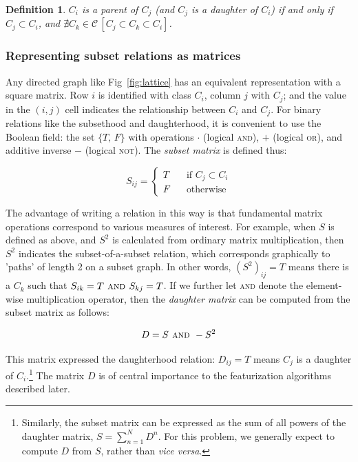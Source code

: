 \documentclass[11pt, oneside]{article}   	%
\newtheorem{definition}{Definition}
\begin{document}
\begin{definition}
	$C_i$ is a \textit{parent} of $C_j$ (and $C_j$ is a \textit{daughter} of $C_i$) if and only if $C_j \subset C_i$, and $\nexists C_k \in \mathcal C \, [C_j \subset C_k \subset C_i]$.
\end{definition}

\subsubsection{Representing subset relations as matrices}

\vspace{\baselineskip} Any directed graph like Fig~\ref{fig:lattice} has an equivalent representation with a square matrix. Row $i$ is identified with class $C_i$, column $j$ with $C_j$; and the value in the $(i,j)$ cell indicates the relationship between $C_i$ and $C_j$. For binary relations like the subsethood and daughterhood, it is convenient to use the Boolean field: the set $\{T, \, F\}$ with operations $\cdot$ (logical \textsc{and}), $+$ (logical \textsc{or}), and additive inverse $-$ (logical \textsc{not}). The \textit{subset matrix} is defined thus:

$$S_{ij} = \begin{cases}
                T & \quad \text{if } C_j \subset C_i \\
                F & \quad \text{otherwise}
                \end{cases}$$

\noindent The advantage of writing a relation in this way is that fundamental matrix operations correspond to various measures of interest. For example, when $S$ is defined as above, and $S^2$ is calculated from ordinary matrix multiplication, then $S^2$ indicates the subset-of-a-subset relation, which corresponds graphically to 'paths' of length 2 on a subset graph. In other words, $(S^2)_{ij} = T$ means there is a $C_k$ such that $S_{ik} = T \textsc{ and } S_{kj} = T$. If we further let \textsc{and} denote the element-wise multiplication operator, then the \textit{daughter matrix} can be computed from the subset matrix as follows: 

$$D = S \textsc{ and } -S^2$$

\noindent This matrix expressed the daughterhood relation: $D_{ij} = T$ means $C_j$ is a daughter of $C_i$.\footnote{Similarly, the subset matrix can be expressed as the sum of all powers of the daughter matrix, \mbox{$S = \sum_{n=1}^N D^n$}. For this problem, we generally expect to compute $D$ from $S$, rather than \textit{vice versa}.} The matrix $D$ is of central importance to the featurization algorithms described later.
\end{document}
